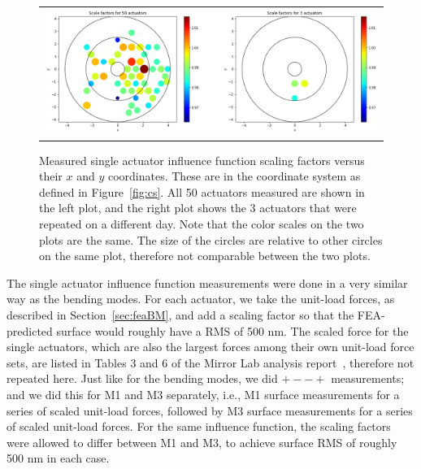 \documentclass [twoside,openbib,12pt]{article}
\begin{document}
 \begin{figure}[bthp]
   \begin{center}
     \begin{tabular}{c}
\includegraphics[width=150mm]{figures/IFdist.png}
  \end{tabular}
   \end{center}
   \caption
   { \label{fig:IFdist}
     Measured single actuator influence function scaling factors
     versus their $x$ and $y$ coordinates. These are in the coordinate
     system as defined in Figure~\ref{fig:cs}.
     All 50 actuators measured are shown in the left plot, and the
     right plot shows the 3 actuators that were repeated on a
     different day.
Note that the color scales on the two plots are the same. The size of
the circles are relative to other circles on the same plot, therefore
not comparable between the two plots.
 }
\end{figure}

The single actuator influence function measurements were done in a
very similar way as the bending modes.
For each actuator, we take the unit-load forces, as described in
Section~\ref{sec:feaBM}, and add a
scaling factor so that the FEA-predicted surface would roughly have a
RMS of 500 nm.
The scaled force for the single actuators, which are also the largest
forces among their own unit-load force sets, are listed in Tables 3
and 6 of the Mirror Lab analysis report~\cite{m1m3UAreport}, therefore not repeated here.
Just like for the bending modes, we did $+--+$ measurements;
and we did 
this for M1 and M3 separately,
i.e., M1 surface measurements for a series of scaled unit-load forces,
followed by M3 surface measurements for a series of scaled unit-load
forces.
For the same influence function,
the scaling factors were allowed to differ between M1 and M3, to
achieve surface RMS of roughly 500 nm in each case.
\end{document}
